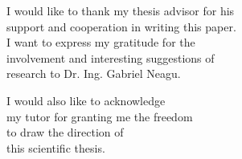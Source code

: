 \vspace*{7cm}
\begin{center}
I would like to thank my thesis advisor for his\\
support and cooperation in writing this paper.\\
I want to express my gratitude for the\\
involvement and interesting suggestions of\\
research to Dr. Ing. Gabriel Neagu.
\end{center}
\vspace{0.6cm}
\begin{center}
I would also like to acknowledge\\
my tutor for granting me the freedom\\
to draw the direction of\\
this scientific thesis.
\end{center}
